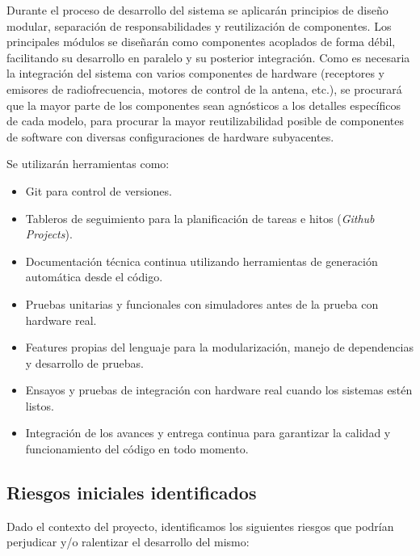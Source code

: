 Durante el proceso de desarrollo del sistema se aplicarán principios de diseño modular, separación de responsabilidades y reutilización de componentes. Los principales módulos se diseñarán como componentes acoplados de forma débil, facilitando su desarrollo en paralelo y su posterior integración. Como es necesaria la integración del sistema con varios componentes de hardware (receptores y emisores de radiofrecuencia, motores de control de la antena, etc.), se procurará que la mayor parte de los componentes sean agnósticos a los detalles específicos de cada modelo, para procurar la mayor reutilizabilidad posible de componentes de software con diversas configuraciones de hardware subyacentes.

Se utilizarán herramientas como:

\begin{itemize}
    \item Git para control de versiones.
    \item Tableros de seguimiento para la planificación de tareas e hitos (\textit{Github Projects}).
    \item Documentación técnica continua utilizando herramientas de generación automática desde el código.
    \item Pruebas unitarias y funcionales con simuladores antes de la prueba con hardware real.
    \item Features propias del lenguaje para la modularización, manejo de dependencias y desarrollo de pruebas.
    \item Ensayos y pruebas de integración con hardware real cuando los sistemas estén listos.
    \item Integración de los avances y entrega continua para garantizar la calidad y funcionamiento del código en todo momento.
\end{itemize}

\subsection*{Riesgos iniciales identificados}

Dado el contexto del proyecto, identificamos los siguientes riesgos que podrían perjudicar y/o ralentizar el desarrollo del mismo:

